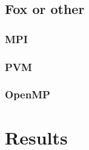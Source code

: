 \subsection{Fox or other}

\subsubsection{MPI}
\subsubsection{PVM}
\subsubsection{OpenMP}

\section{Results}

